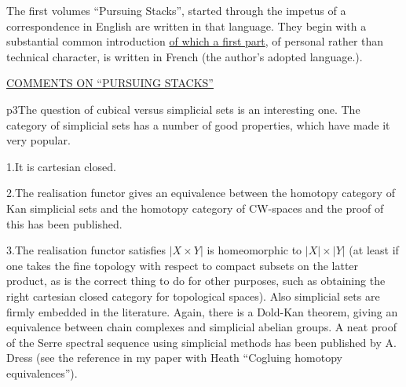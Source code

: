 The  first  volumes ``Pursuing Stacks'', started\unsure{\textendash|,} through the impetus of a correspondence in English are written in that language. They begin with a substantial common introduction \uline{of which a first part}, of personal rather than technical character, is written in French (the author's adopted language.).

\begin{center}\uline{COMMENTS ON ``PURSUING STACKS''}\end{center}


p3\qquad The question of cubical versus simplicial sets is an interesting one. The category of simplicial sets has a number of good properties, which have made it very popular.

1.\quad It is cartesian closed.

2.\quad The realisation functor gives an equivalence between the homotopy category of Kan simplicial sets and the homotopy category of CW-spaces and the proof of this has been published.

3.\quad The realisation functor satisfies $\lvert X\times Y\rvert$ is homeomorphic to $\lvert X\rvert\times\lvert Y\rvert$ (at least if one takes the fine topology with respect to compact subsets on the latter product, as is the correct thing to do for other purposes, such as obtaining the right cartesian closed category for topological spaces). Also simplicial sets are firmly embedded in the literature. Again, there is a Dold-Kan theorem, giving an equivalence between chain complexes and simplicial abelian groups. A neat proof of the Serre spectral sequence using simplicial methods has been published by A. Dress (see the reference in my paper with Heath ``Cogluing homotopy equivalences'').


